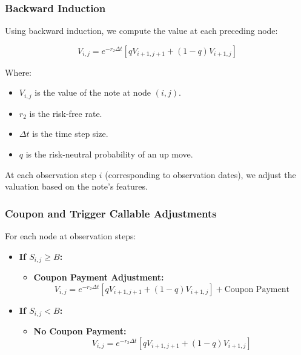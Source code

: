 \documentclass[12pt,a4paper]{article}
\begin{document}
\subsubsection*{Backward Induction}

Using backward induction, we compute the value at each preceding node:

\[
V_{i,j} = e^{-r_2 \Delta t} \left[ q V_{i+1,j+1} + (1 - q) V_{i+1,j} \right]
\]

Where:

\begin{itemize}
    \item \( V_{i,j} \) is the value of the note at node \( (i, j) \).
    \item \( r_2 \) is the risk-free rate.
    \item \( \Delta t \) is the time step size.
    \item \( q \) is the risk-neutral probability of an up move.
\end{itemize}

At each observation step \( i \) (corresponding to observation dates), we adjust the valuation based on the note's features.

\subsubsection*{Coupon and Trigger Callable Adjustments}

For each node at observation steps:

\begin{itemize}
    \item \textbf{If \( S_{i,j} \geq B \):}
    \begin{itemize}
        \item \textbf{Coupon Payment Adjustment:}
        \[
        V_{i,j} = e^{-r_2 \Delta t} \left[ q V_{i+1,j+1} + (1 - q) V_{i+1,j} \right] + \text{Coupon Payment}
        \]
    \end{itemize}
    \item \textbf{If \( S_{i,j} < B \):}
    \begin{itemize}
        \item \textbf{No Coupon Payment:}
        \[
        V_{i,j} = e^{-r_2 \Delta t} \left[ q V_{i+1,j+1} + (1 - q) V_{i+1,j} \right]
        \]
    \end{itemize}
\end{itemize}
\end{document}
